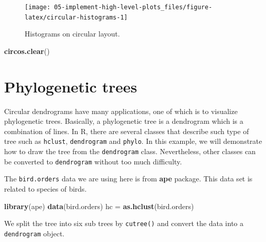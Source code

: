 \documentclass[]{book}
\newenvironment{Shaded}{\begin{snugshade}}{\end{snugshade}}
\newcommand{\KeywordTok}[1]{\textcolor[rgb]{0.13,0.29,0.53}{\textbf{#1}}}
\newcommand{\DecValTok}[1]{\textcolor[rgb]{0.00,0.00,0.81}{#1}}
\newcommand{\StringTok}[1]{\textcolor[rgb]{0.31,0.60,0.02}{#1}}
\newcommand{\CommentTok}[1]{\textcolor[rgb]{0.56,0.35,0.01}{\textit{#1}}}
\newcommand{\OperatorTok}[1]{\textcolor[rgb]{0.81,0.36,0.00}{\textbf{#1}}}
\newcommand{\NormalTok}[1]{#1}
\theoremstyle{definition}
\theoremstyle{definition}
\theoremstyle{remark}
\begin{document}
\begin{figure}

{\centering \texttt{[image: 05-implement-high-level-plots\_files/figure-latex/circular-histograms-1]} 

}

\caption{Histograms on circular layout.}\label{fig:circular-histograms}
\end{figure}

\begin{Shaded}
\begin{Highlighting}[]
\KeywordTok{circos.clear}\NormalTok{()}
\end{Highlighting}
\end{Shaded}

\section{Phylogenetic trees}\label{phylogenetic-trees}

Circular dendrograms have many applications, one of which is to
visualize phylogenetic trees. Basically, a phylogenetic tree is a
dendrogram which is a combination of lines. In R, there are several
classes that describe such type of tree such as \texttt{hclust},
\texttt{dendrogram} and \texttt{phylo}. In this example, we will
demonstrate how to draw the tree from the \texttt{dendrogram} class.
Nevertheless, other classes can be converted to \texttt{dendrogram}
without too much difficulty.

The \texttt{bird.orders} data we are using here is from \textbf{ape}
package. This data set is related to species of birds.

\begin{Shaded}
\begin{Highlighting}[]
\KeywordTok{library}\NormalTok{(ape)}
\KeywordTok{data}\NormalTok{(bird.orders)}
\NormalTok{hc =}\StringTok{ }\KeywordTok{as.hclust}\NormalTok{(bird.orders)}
\end{Highlighting}
\end{Shaded}

We split the tree into six sub trees by \texttt{cutree()} and convert
the data into a \texttt{dendrogram} object.

\begin{Shaded}
\end{Shaded}
\end{document}
